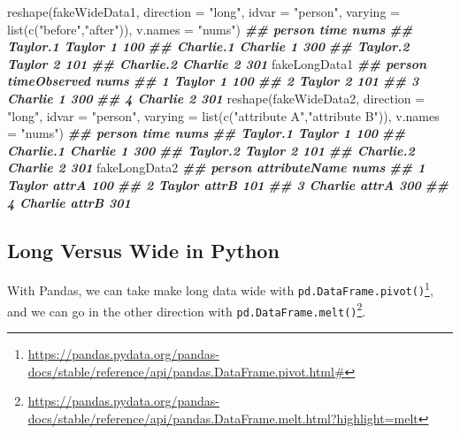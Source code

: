 \documentclass[
  12pt,
  krantz2]{krantz}
\makeatletter
\newenvironment{Shaded}{\begin{snugshade}}{\end{snugshade}}
\newcommand{\AttributeTok}[1]{\textcolor[rgb]{0.61,0.61,0.61}{#1}}
\newcommand{\DocumentationTok}[1]{\textcolor[rgb]{0.37,0.37,0.37}{\textbf{\textit{#1}}}}
\newcommand{\FunctionTok}[1]{\textcolor[rgb]{0,0,0}{#1}}
\newcommand{\NormalTok}[1]{#1}
\newcommand{\StringTok}[1]{\textcolor[rgb]{0.5,0.5,0.5}{#1}}
\renewcommand{\href}[2]{#2\footnote{\url{#1}}}
\newenvironment{kframe}{%
\medskip{}
\setlength{\fboxsep}{.8em}
 \def\at@end@of@kframe{}%
 \ifinner\ifhmode%
  \def\at@end@of@kframe{\end{minipage}}%
  \begin{minipage}{\columnwidth}%
 \fi\fi%
 \def\FrameCommand##1{\hskip\@totalleftmargin \hskip-\fboxsep
 \colorbox{shadecolor}{##1}\hskip-\fboxsep
     \hskip-\linewidth \hskip-\@totalleftmargin \hskip\columnwidth}%
 \MakeFramed {\advance\hsize-\width
   \@totalleftmargin\z@ \linewidth\hsize
   \@setminipage}}%
 {\par\unskip\endMakeFramed%
 \at@end@of@kframe}
\renewenvironment{Shaded}{\begin{kframe}}{\end{kframe}}
\makeatother
\begin{document}
\begin{Shaded}
\begin{Highlighting}[]
\FunctionTok{reshape}\NormalTok{(fakeWideData1, }
        \AttributeTok{direction =} \StringTok{"long"}\NormalTok{,}
        \AttributeTok{idvar =} \StringTok{"person"}\NormalTok{, }
        \AttributeTok{varying =} \FunctionTok{list}\NormalTok{(}\FunctionTok{c}\NormalTok{(}\StringTok{"before"}\NormalTok{,}\StringTok{"after"}\NormalTok{)),}
        \AttributeTok{v.names =} \StringTok{"nums"}\NormalTok{)}
\DocumentationTok{\#\#            person time nums}
\DocumentationTok{\#\# Taylor.1   Taylor    1  100}
\DocumentationTok{\#\# Charlie.1 Charlie    1  300}
\DocumentationTok{\#\# Taylor.2   Taylor    2  101}
\DocumentationTok{\#\# Charlie.2 Charlie    2  301}
\NormalTok{fakeLongData1}
\DocumentationTok{\#\#    person timeObserved nums}
\DocumentationTok{\#\# 1  Taylor            1  100}
\DocumentationTok{\#\# 2  Taylor            2  101}
\DocumentationTok{\#\# 3 Charlie            1  300}
\DocumentationTok{\#\# 4 Charlie            2  301}
\FunctionTok{reshape}\NormalTok{(fakeWideData2, }
        \AttributeTok{direction =} \StringTok{"long"}\NormalTok{,}
        \AttributeTok{idvar =} \StringTok{"person"}\NormalTok{, }
        \AttributeTok{varying =} \FunctionTok{list}\NormalTok{(}\FunctionTok{c}\NormalTok{(}\StringTok{"attribute A"}\NormalTok{,}\StringTok{"attribute B"}\NormalTok{)),}
        \AttributeTok{v.names =} \StringTok{"nums"}\NormalTok{)}
\DocumentationTok{\#\#            person time nums}
\DocumentationTok{\#\# Taylor.1   Taylor    1  100}
\DocumentationTok{\#\# Charlie.1 Charlie    1  300}
\DocumentationTok{\#\# Taylor.2   Taylor    2  101}
\DocumentationTok{\#\# Charlie.2 Charlie    2  301}
\NormalTok{fakeLongData2}
\DocumentationTok{\#\#    person attributeName nums}
\DocumentationTok{\#\# 1  Taylor         attrA  100}
\DocumentationTok{\#\# 2  Taylor         attrB  101}
\DocumentationTok{\#\# 3 Charlie         attrA  300}
\DocumentationTok{\#\# 4 Charlie         attrB  301}
\end{Highlighting}
\end{Shaded}

\hypertarget{long-versus-wide-in-python}{%
\subsection{Long Versus Wide in Python}\label{long-versus-wide-in-python}}

With Pandas, we can take make long data wide with \href{https://pandas.pydata.org/pandas-docs/stable/reference/api/pandas.DataFrame.pivot.html\#}{\texttt{pd.DataFrame.pivot()}}, and we can go in the other direction with \href{https://pandas.pydata.org/pandas-docs/stable/reference/api/pandas.DataFrame.melt.html?highlight=melt}{\texttt{pd.DataFrame.melt()}}.
\end{document}
